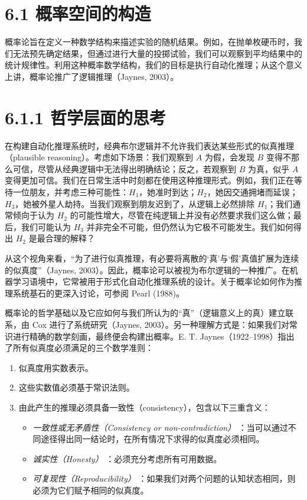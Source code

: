 \section*{6.1 概率空间的构造}
\label{sec:6.1}

概率论旨在定义一种数学结构来描述实验的随机结果。例如，在抛单枚硬币时，我们无法预先确定结果，但通过进行大量的投掷试验，我们可以观察到平均结果中的统计规律性。利用这种概率数学结构，我们的目标是执行自动化推理；从这个意义上讲，概率论推广了逻辑推理（Jaynes, 2003）。

\section*{6.1.1 哲学层面的思考}

在构建自动化推理系统时，经典布尔逻辑并不允许我们表达某些形式的似真推理（plausible reasoning）。考虑如下场景：我们观察到 $ A $ 为假，会发现 $ B $ 变得不那么可信，尽管从经典逻辑中无法得出明确结论；反之，若观察到 $ B $ 为真，似乎 $ A $ 变得更加可信。我们在日常生活中时刻都在使用这种推理形式。例如，我们正在等待一位朋友，并考虑三种可能性：$ H_1 $，她准时到达；$ H_2 $，她因交通拥堵而延误；$ H_3 $，她被外星人劫持。当我们观察到朋友迟到了，从逻辑上必然排除 $ H_1 $；我们通常倾向于认为 $ H_2 $ 的可能性增大，尽管在纯逻辑上并没有必然要求我们这么做；最后，我们可能认为 $ H_3 $ 并非完全不可能，但仍然认为它极不可能发生。我们如何得出 $ H_2 $ 是最合理的解释？

从这个视角来看，“为了进行似真推理，有必要将离散的‘真’与‘假’真值扩展为连续的似真度”（Jaynes, 2003）。因此，概率论可以被视为布尔逻辑的一种推广。在机器学习语境中，它常被用于形式化自动化推理系统的设计。关于概率论如何作为推理系统基石的更深入讨论，可参阅 Pearl (1988)。

概率论的哲学基础以及它应如何与我们所认为的“真”（逻辑意义上的真）建立联系，由 Cox 进行了系统研究（Jaynes, 2003）。另一种理解方式是：如果我们对常识进行精确的数学刻画，最终便会构建出概率。E. T. Jaynes（1922–1998）指出了所有似真度必须满足的三个数学准则：

\begin{enumerate}
\item 似真度用实数表示。
\item 这些实数值必须基于常识法则。
\item 由此产生的推理必须具备一致性（consistency），包含以下三重含义：
\begin{itemize}
\item \emph{一致性或无矛盾性（Consistency or non-contradiction）} ：当可以通过不同途径得出同一结论时，在所有情况下求得的似真度必须相同。
\item \emph{诚实性（Honesty）} ：必须充分考虑所有可用数据。
\item \emph{可复现性（Reproducibility）} ：如果我们对两个问题的认知状态相同，则必须为它们赋予相同的似真度。
\end{itemize}
\end{enumerate}

